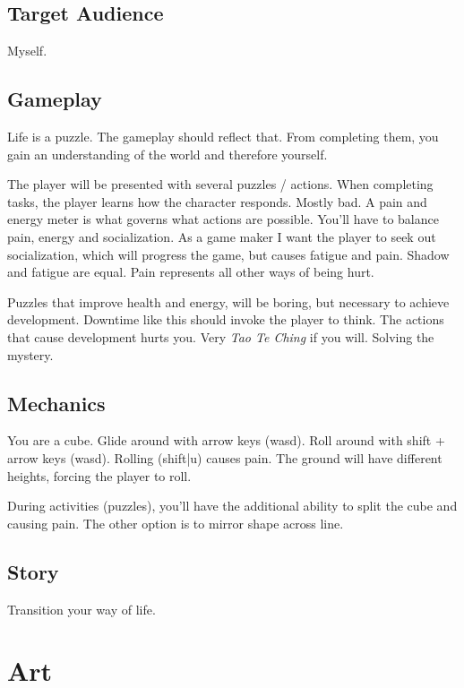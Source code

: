 \documentclass[12pt, letterpaper]{article}
\begin{document}
\subsection{Target Audience}

Myself.

\subsection{Gameplay}

Life is a puzzle. The gameplay should reflect that.
From completing them, you gain an understanding of the world and
therefore yourself.

The player will be presented with several puzzles / actions. When completing
tasks, the player learns how the character responds. Mostly bad. A pain and
energy meter is what governs what actions are possible. You'll have to balance
pain, energy and socialization. As a game maker I want the player to seek out
socialization, which will progress the game, but causes fatigue and pain.
Shadow and fatigue are equal. Pain represents all other ways of being hurt.

Puzzles that improve health and energy, will be boring, but necessary to
achieve development. Downtime like this should invoke the player to think. The
actions that cause development hurts you. Very \textit{Tao Te Ching} if you
will. Solving the mystery.

\subsection{Mechanics}

You are a cube. Glide around with arrow keys (wasd). Roll around with shift +
arrow keys (wasd). Rolling (shift|u) causes pain. The ground will have
different heights, forcing the player to roll. 

During activities (puzzles), you'll have the additional ability to split the
cube and causing pain. The other option is to mirror shape across line.

\subsection{Story}

Transition your way of life.

\section{Art}
\end{document}
